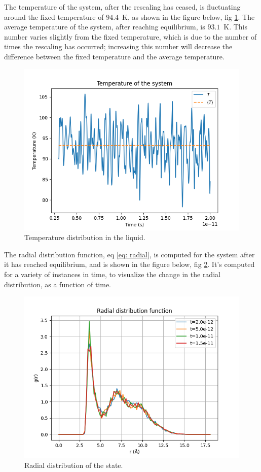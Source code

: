 \documentclass[a4paper]{article}
\newcommand{\newparagraph}{\vspace{.5cm}\noindent}
\begin{document}
\newparagraph
The temperature of the system, after the rescaling has ceased, is fluctuating around the fixed temperature of $94.4$~K, as shown in the figure below, fig \ref{fig: temperature}.
The average temperature of the system, after reaching equilibrium, is $93.1$~K. This number varies slightly from the fixed temperature, which is due to the number of times the rescaling has occurred; increasing this number will decrease the difference between the fixed temperature and the average temperature.
\begin{figure}[H]
    \centering
    \includegraphics[scale = .5]{temperature.png}
    \caption{Temperature distribution in the liquid.}
    \label{fig: temperature}
\end{figure}\noindent
The radial distribution function, eq \eqref{eq: radial}, is computed for the system after it has reached equilibrium, and is shown in the figure below, fig \ref{fig: radial}.
It's computed for a variety of instances in time, to visualize the change in the radial distribution, as a function of time.
\begin{figure}[H]
    \centering
    \includegraphics[scale = .5]{radial.png}
    \caption{Radial distribution of the state.}
    \label{fig: radial}
\end{figure}\noindent
\end{document}

